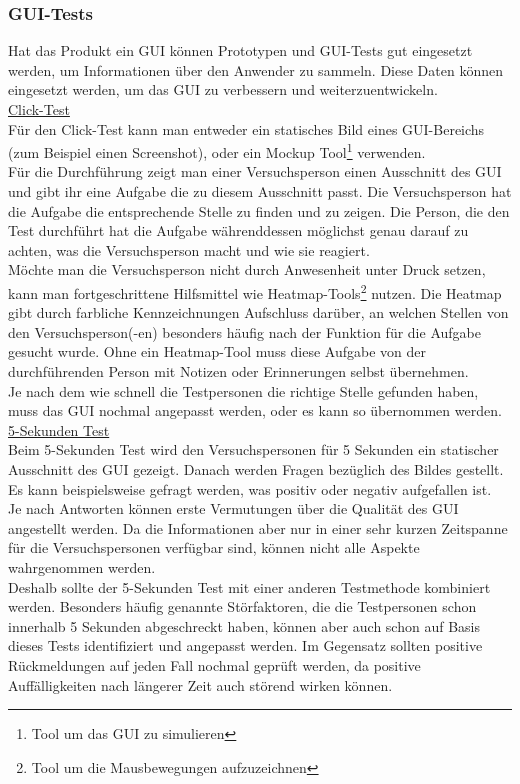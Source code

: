 \documentclass[a4paper,12pt,top=2.5cm,bottom=2.5cm, left=2.5cm, right=2.5cm, numbers=noenddot]{scrartcl}
\begin{document}
\subsubsection{GUI-Tests}
Hat das Produkt ein GUI können Prototypen und GUI-Tests gut eingesetzt werden, um Informationen über den Anwender zu sammeln. Diese Daten können eingesetzt werden, um das GUI zu verbessern und weiterzuentwickeln.
\vspace{3mm}\\
\noindent
\underline{Click-Test}
\\Für den Click-Test kann man entweder ein statisches Bild eines GUI-Bereichs (zum Beispiel einen Screenshot), oder ein Mockup Tool\footnote{Tool um das GUI zu simulieren} verwenden.
\\Für die Durchführung zeigt man einer Versuchsperson einen Ausschnitt des GUI und gibt ihr eine Aufgabe die zu diesem Ausschnitt passt. Die Versuchsperson hat die Aufgabe die entsprechende Stelle zu finden und zu zeigen. Die Person, die den Test durchführt hat die Aufgabe währenddessen möglichst genau darauf zu achten, was die Versuchsperson macht und wie sie reagiert. 
\\Möchte man die Versuchsperson nicht durch Anwesenheit unter Druck setzen, kann man fortgeschrittene Hilfsmittel wie Heatmap-Tools\footnote{Tool um die Mausbewegungen aufzuzeichnen} nutzen. Die Heatmap gibt durch farbliche Kennzeichnungen Aufschluss darüber, an welchen Stellen von den Versuchsperson(-en) besonders häufig nach der Funktion für die Aufgabe gesucht wurde. Ohne ein Heatmap-Tool muss diese Aufgabe von der durchführenden Person mit Notizen oder Erinnerungen selbst übernehmen. 
\\Je nach dem wie schnell die Testpersonen die richtige Stelle gefunden haben, muss das GUI nochmal angepasst werden, oder es kann so übernommen werden.\vspace{3mm}
\noindent
\underline{5-Sekunden Test}
\\Beim 5-Sekunden Test wird den Versuchspersonen für 5 Sekunden ein statischer Ausschnitt des GUI gezeigt. Danach werden Fragen bezüglich des Bildes gestellt. Es kann beispielsweise gefragt werden, was positiv oder negativ aufgefallen ist. 
\\Je nach Antworten können erste Vermutungen über die Qualität des GUI angestellt werden. Da die Informationen aber nur in einer sehr kurzen Zeitspanne für die Versuchspersonen verfügbar sind, können nicht alle Aspekte wahrgenommen werden. 
\\Deshalb sollte der 5-Sekunden Test mit einer anderen Testmethode kombiniert werden. Besonders häufig genannte Störfaktoren, die die Testpersonen schon innerhalb 5 Sekunden abgeschreckt haben, können aber auch schon auf Basis dieses Tests identifiziert und angepasst werden. Im Gegensatz sollten positive Rückmeldungen auf jeden Fall nochmal geprüft werden, da positive Auffälligkeiten nach längerer Zeit auch störend wirken können.
\end{document}
